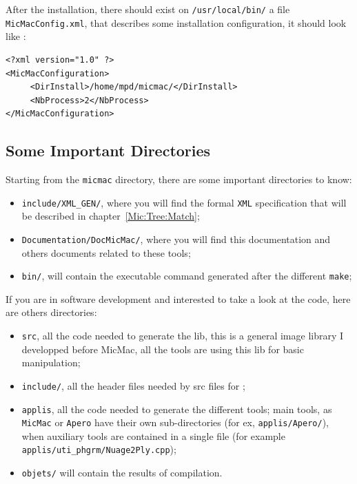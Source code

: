 After the installation, there should exist on {\tt /usr/local/bin/} a file
{\tt MicMacConfig.xml}, that describes some installation configuration,
it should look like :

\label{Mic:File:Config}

\begin{verbatim}
<?xml version="1.0" ?>
<MicMacConfiguration>
     <DirInstall>/home/mpd/micmac/</DirInstall>
     <NbProcess>2</NbProcess>
</MicMacConfiguration>
\end{verbatim}



\subsection{Some Important Directories}

Starting from the {\tt micmac} directory, there are some important directories
to know:

\begin{itemize}
   \item {\tt include/XML\_GEN/}, where you will find the formal {\tt XML} specification that will
         be described in chapter~\ref{Mic:Tree:Match};

   \item {\tt Documentation/DocMicMac/}, where you will find this documentation and others
        documents related to these tools;

   \item {\tt bin/}, will contain the executable command generated  after the different {\tt make};
\end{itemize}


If you are in software development and interested to take a look at the code, 
here are others directories:


\begin{itemize}
   \item {\tt src}, all the \CPP code needed to generate the \ELISE lib, this is a general image library
         I developped before MicMac, all the tools are using this lib for basic manipulation;

   \item {\tt include/}, all the header files  needed by src files for \ELISE ;

   \item {\tt applis}, all the \CPP code needed to generate  the different tools;  main tools, as
         {\tt MicMac} or {\tt Apero} have their own sub-directories (for ex, {\tt applis/Apero/}),
         when auxiliary tools are contained in a single file (for example {\tt applis/uti\_phgrm/Nuage2Ply.cpp});

   \item {\tt objets/}  will contain the results of compilation.

\end{itemize}



